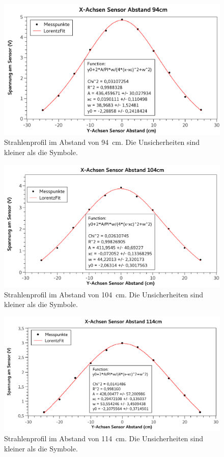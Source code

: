 \documentclass[
	a4paper,
	12pt,
	pagesize,
	ngerman
]{scrartcl}
\begin{document}
	\begin{figure}[H]
		\includegraphics[width=1\textwidth]{fig_94cm}
		\centering
		\caption{Strahlenprofil im Abstand von \SI{94}{cm}. Die Unsicherheiten sind kleiner als die Symbole.}
		\label{fig_94cm}
		\centering
	\end{figure}
	\begin{figure}[H]
		\includegraphics[width=1\textwidth]{fig_104cm}
		\centering
		\caption{Strahlenprofil im Abstand von \SI{104}{cm}. Die Unsicherheiten sind kleiner als die Symbole.}
		\label{fig_104cm}
		\centering
	\end{figure}
	\begin{figure}[H]
		\includegraphics[width=1\textwidth]{fig_114cm}
		\centering
		\caption{Strahlenprofil im Abstand von \SI{114}{cm}. Die Unsicherheiten sind kleiner als die Symbole.}
		\label{fig_114cm}
		\centering
	\end{figure}
\end{document}

